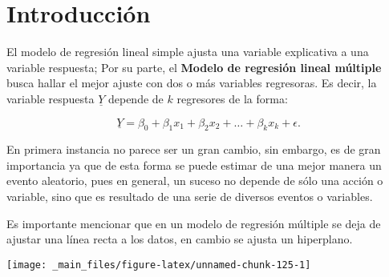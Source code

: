 \documentclass[
  a4paper,
  oneside,
  openany]{book}
\newenvironment{Shaded}{\begin{snugshade}}{\end{snugshade}}
\newcommand{\AttributeTok}[1]{\textcolor[rgb]{0.13,0.29,0.53}{#1}}
\newcommand{\DecValTok}[1]{\textcolor[rgb]{0.00,0.00,0.81}{#1}}
\newcommand{\FunctionTok}[1]{\textcolor[rgb]{0.13,0.29,0.53}{\textbf{#1}}}
\newcommand{\NormalTok}[1]{#1}
\newcommand{\OtherTok}[1]{\textcolor[rgb]{0.56,0.35,0.01}{#1}}
\newcommand{\SpecialCharTok}[1]{\textcolor[rgb]{0.81,0.36,0.00}{\textbf{#1}}}
\newcommand{\StringTok}[1]{\textcolor[rgb]{0.31,0.60,0.02}{#1}}
\begin{document}
\hypertarget{introducciuxf3n-6}{%
\section{Introducción}\label{introducciuxf3n-6}}

El modelo de regresión lineal simple ajusta una variable explicativa a una variable respuesta; Por su parte, el \textbf{Modelo de regresión lineal múltiple} busca hallar el mejor ajuste con dos o más variables regresoras. Es decir, la variable respuesta \(\underline{Y}\) depende de \(k\) regresores de la forma:

\[
\underline{Y}=\beta_{0}+\beta_{1}x_{1}+\beta_{2}x_{2}+ \ldots +\beta_{k}x_{k}+\epsilon.
\]

En primera instancia no parece ser un gran cambio, sin embargo, es de gran importancia ya que de esta forma se puede estimar de una mejor manera un evento aleatorio, pues en general, un suceso no depende de sólo una acción o variable, sino que es resultado de una serie de diversos eventos o variables.

Es importante mencionar que en un modelo de regresión múltiple se deja de ajustar una línea recta a los datos, en cambio se ajusta un hiperplano.

\begin{Shaded}
\end{Shaded}

\begin{center}\texttt{[image: \_main\_files/figure-latex/unnamed-chunk-125-1]} \end{center}
\end{document}
